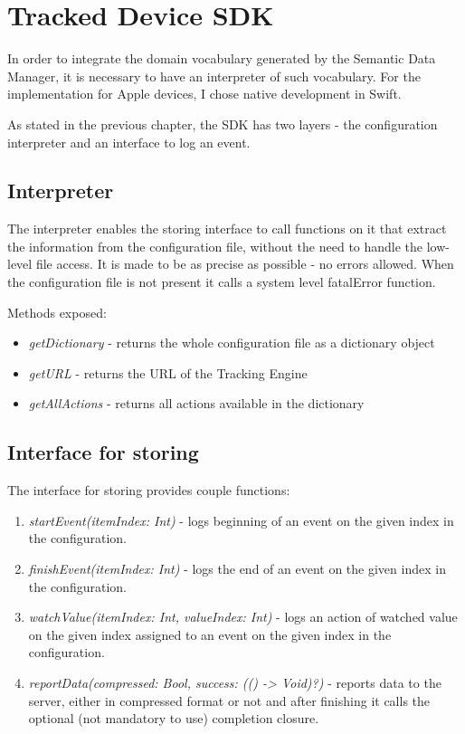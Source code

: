 \newpage

\section{Tracked Device SDK}

In order to integrate the domain vocabulary generated by the Semantic Data Manager, it is necessary to have an interpreter of such vocabulary. For the implementation for Apple devices, I chose native development in Swift.

As stated in the previous chapter, the SDK has two layers - the configuration interpreter and an interface to log an event.

\subsection{Interpreter}

The interpreter enables the storing interface to call functions on it that extract the information from the configuration file, without the need to handle the low-level file access. It is made to be as precise as possible - no errors allowed. When the configuration file is not present it calls a system level fatalError function. 

Methods exposed:

\begin{itemize}
	\item \emph{getDictionary} - returns the whole configuration file as a dictionary object
	\item \emph{getURL} - returns the URL of the Tracking Engine
	\item \emph{getAllActions} - returns all actions available in the dictionary
\end{itemize}

\subsection{Interface for storing}

The interface for storing provides couple functions:

\begin{enumerate}
	\item \emph{startEvent(itemIndex: Int)} - logs beginning of an event on the given index in the configuration.
	\item \emph{finishEvent(itemIndex: Int)} - logs the end of an event on the given index in the configuration.
	\item \emph{watchValue(itemIndex: Int, valueIndex: Int)} - logs an action of watched value on the given index assigned to an event on the given index in the configuration.
	\item \emph{reportData(compressed: Bool, success: (() -> Void)?)} - reports data to the server, either in compressed format or not and after finishing it calls the optional (not mandatory to use) completion closure.
\end{enumerate}

